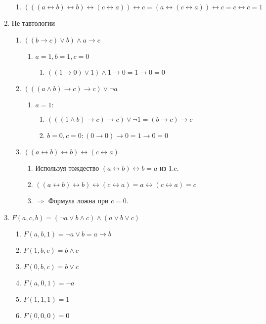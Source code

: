 \documentclass[10pt]{article}
\begin{document}
\begin{enumerate}[1]
\begin{enumerate}
\item[] $(((a \leftrightarrow b) \leftrightarrow b) \leftrightarrow (c \leftrightarrow a)) \leftrightarrow c = (a \leftrightarrow (c \leftrightarrow a)) \leftrightarrow c = c \leftrightarrow c = 1$
\end{enumerate}

\item Не тавтологии

\begin{enumerate}
\item $((b \to c) \lor b) \land a \to c$
	\begin{enumerate}
		\item[] $a=1, b=1, c=0$
		\begin{enumerate}
			\item[] $((1 \to 0) \lor 1) \land 1 \to 0 = 1 \to 0 = 0$
		\end{enumerate}
	\end{enumerate}

\item $(((a \land b) \to c) \to c) \lor \neg a$
	\begin{enumerate}
		\item[] $a=1:$
		\begin{enumerate}
			\item[] $(((1 \land b) \to c) \to c) \lor \neg 1 = (b \to c) \to c$
			\item[] $b=0, c=0: (0 \to 0) \to 0 = 1 \to 0 = 0$
		\end{enumerate}
	\end{enumerate}
	
\item $((a \leftrightarrow b) \leftrightarrow b) \leftrightarrow (c \leftrightarrow a)$
	\begin{enumerate}
	\item[] Используя тождество $(a \leftrightarrow b) \leftrightarrow b = a$ из 1.e.
	\item[] $((a \leftrightarrow b) \leftrightarrow b) \leftrightarrow (c \leftrightarrow a) = a \leftrightarrow (c \leftrightarrow a) = c$
	\item[] $\Rightarrow$ Формула ложна при $c=0$.
	\end{enumerate}
\end{enumerate}

\item $F(a, c, b) = (\neg a \lor b \land c) \land (a \lor b \lor c)$
	\begin{enumerate}
	\item[] $F(a, b, 1) = \neg a \lor b = a \to b$
	\item[] $F(1, b, c) = b \land c$
	\item[] $F(0, b, c) = b \lor c$
	\item[] $F(a, 0, 1) = \neg a$
	\item[] $F(1, 1, 1) = 1$
	\item[] $F(0, 0, 0) = 0$
	\end{enumerate}
\end{enumerate}
\end{document}
